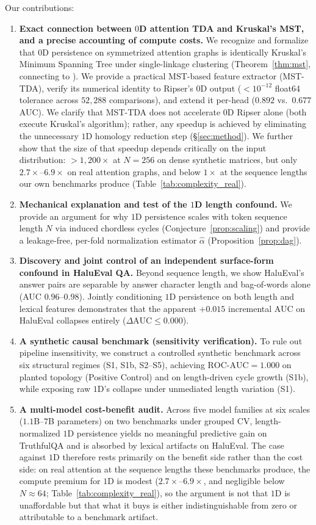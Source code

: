 \documentclass{article}
\begin{document}
Our contributions:
\begin{enumerate}
    \item \textbf{Exact connection between $0$D attention TDA and Kruskal's MST, and a precise accounting of compute costs.} We recognize and formalize that $0$D persistence on symmetrized attention graphs is identically Kruskal's Minimum Spanning Tree under single-linkage clustering (Theorem~\ref{thm:mst}, connecting to \citet{gower1969, carlsson2009}). We provide a practical MST-based feature extractor (MST-TDA), verify its numerical identity to Ripser's $0$D output ($<10^{-12}$ float64 tolerance across $52{,}288$ comparisons), and extend it per-head ($0.892$ vs.\ $0.677$ AUC). We clarify that MST-TDA does not accelerate $0$D Ripser alone (both execute Kruskal's algorithm); rather, any speedup is achieved by eliminating the unnecessary $1$D homology reduction step (\S\ref{sec:method}). We further show that the size of that speedup depends critically on the input distribution: $>\!1{,}200\times$ at $N{=}256$ on dense synthetic matrices, but only $2.7\times$--$6.9\times$ on real attention graphs, and below $1\times$ at the sequence lengths our own benchmarks produce (Table~\ref{tab:complexity_real}).
    \item \textbf{Mechanical explanation and test of the $1$D length confound.} We provide an argument for why $1$D persistence scales with token sequence length $N$ via induced chordless cycles (Conjecture~\ref{prop:scaling}) and provide a leakage-free, per-fold normalization estimator $\hat\alpha$ (Proposition~\ref{prop:dag}).
    \item \textbf{Discovery and joint control of an independent surface-form confound in HaluEval QA.} Beyond sequence length, we show HaluEval's answer pairs are separable by answer character length and bag-of-words alone (AUC $0.96$--$0.98$). Jointly conditioning $1$D persistence on both length and lexical features demonstrates that the apparent $+0.015$ incremental AUC on HaluEval collapses entirely ($\Delta\text{AUC} \le 0.000$).
    \item \textbf{A synthetic causal benchmark (sensitivity verification).} To rule out pipeline insensitivity, we construct a controlled synthetic benchmark across six structural regimes (S1, S1b, S2--S5), achieving $\text{ROC-AUC}=1.000$ on planted topology (Positive Control) and on length-driven cycle growth (S1b), while exposing raw $1$D's collapse under unmediated length variation (S1).
    \item \textbf{A multi-model cost-benefit audit.} Across five model families at six scales ($1.1$B--$7$B parameters) on two benchmarks under grouped CV, length-normalized $1$D persistence yields no meaningful predictive gain on TruthfulQA and is absorbed by lexical artifacts on HaluEval. The case against $1$D therefore rests primarily on the benefit side rather than the cost side: on real attention at the sequence lengths these benchmarks produce, the compute premium for $1$D is modest ($2.7\times$--$6.9\times$, and negligible below $N\approx64$; Table~\ref{tab:complexity_real}), so the argument is not that $1$D is unaffordable but that what it buys is either indistinguishable from zero or attributable to a benchmark artifact.
\end{enumerate}
\end{document}
